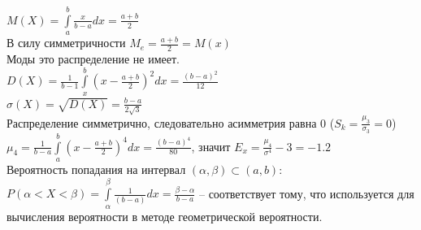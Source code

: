 \documentclass[russian, 12pt, fleqn,x11names]{article}
\begin{document}
$M(X) = \int\limits_{a}^{b}\frac{x}{b-a}dx = \frac{a + b}{2}$\\
В силу симметричности $M_e= \frac{a+b}{2} = M(x)$\\
Моды это распределение не имеет.\\
$D(X) = \frac{1}{b - 1} \int\limits_{x}^b(x - \frac{a + b}{2})^2dx = \frac{(b - a)^2}{12}$\\
$\sigma(X) = \sqrt{D(X)} = \frac{b - a}{2\sqrt{3}}$\\
Распределение симметрично, следовательно асимметрия равна 0 ($S_k = \frac{\mu_3}{\sigma_3} = 0$)\\
$\mu_4 = \frac{1}{b - a} \int\limits_{a}^{b}(x - \frac{a + b}{2})^4dx = \frac{(b - a)^4}{80}$, значит $E_x = \frac{\mu_4}{\sigma^4} - 3 = -1.2$\\
Вероятность попадания на интервал $(\alpha, \beta) \subset (a, b)$:\\
$P(\alpha<X<\beta) = \int\limits_{\alpha}^{\beta} \frac{1}{(b - a)}dx = \frac{\beta - \alpha}{b - a}$ -- соответствует тому, что используется для вычисления вероятности в методе геометрической вероятности.\\
\end{document}
